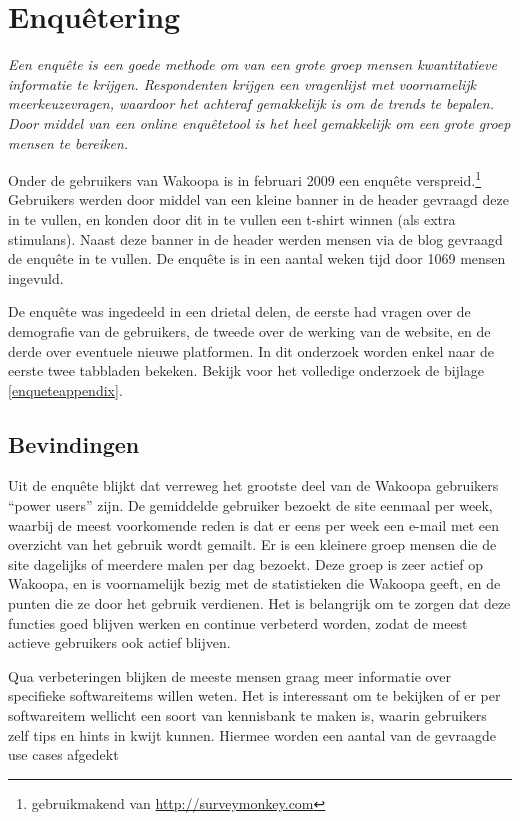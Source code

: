 \documentclass[a4paper, 10pt, pdftex]{report}
\begin{document}
    \section{Enqu\^etering}
    \textit{Een enqu\^ete is een goede methode om van een grote groep mensen kwantitatieve informatie te krijgen. Respondenten krijgen een vragenlijst met voornamelijk meerkeuzevragen, waardoor het achteraf gemakkelijk is om de trends te bepalen. Door middel van een online enqu\^etetool is het heel gemakkelijk om een grote groep mensen te bereiken.}

    Onder de gebruikers van Wakoopa is in februari 2009 een enqu\^ete verspreid.\footnote{gebruikmakend van \url{http://surveymonkey.com}} Gebruikers werden door middel van een kleine banner in de header gevraagd deze in te vullen, en konden door dit in te vullen een t-shirt winnen (als extra stimulans). Naast deze banner in de header werden mensen via de blog gevraagd de enqu\^ete in te vullen. De enqu\^ete is in een aantal weken tijd door 1069 mensen ingevuld.

    De enqu\^ete was ingedeeld in een drietal delen, de eerste had vragen over de demografie van de gebruikers, de tweede over de werking van de website, en de derde over eventuele nieuwe platformen. In dit onderzoek worden enkel naar de eerste twee tabbladen bekeken. Bekijk voor het volledige onderzoek de bijlage \ref{enqueteappendix}.
  \subsection{Bevindingen}
    Uit de enqu\^ete blijkt dat verreweg het grootste deel van de Wakoopa gebruikers ``power users'' zijn. De gemiddelde gebruiker bezoekt de site eenmaal per week, waarbij de meest voorkomende reden is dat er eens per week een e-mail met een overzicht van het gebruik wordt gemailt. Er is een kleinere groep mensen die de site dagelijks of meerdere malen per dag bezoekt. Deze groep is zeer actief op Wakoopa, en is voornamelijk bezig met de statistieken die Wakoopa geeft, en de punten die ze door het gebruik verdienen. Het is belangrijk om te zorgen dat deze functies goed blijven werken en continue verbeterd worden, zodat de meest actieve gebruikers ook actief blijven.

    Qua verbeteringen blijken de meeste mensen graag meer informatie over specifieke softwareitems willen weten. Het is interessant om te bekijken of er per softwareitem wellicht een soort van kennisbank te maken is, waarin gebruikers zelf tips en hints in kwijt kunnen. Hiermee worden een aantal van de gevraagde use cases afgedekt
\end{document}
